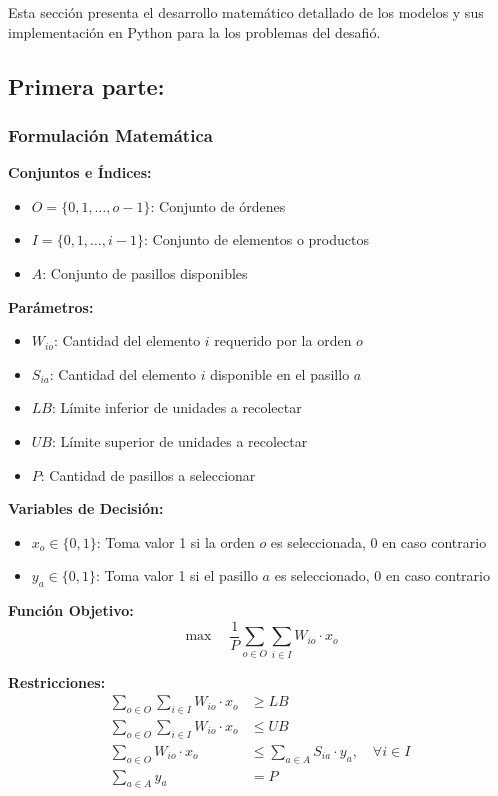 \documentclass[a4paper,12pt]{article}
\begin{document}
Esta sección presenta el desarrollo matemático detallado de los modelos y sus implementación en Python para la los problemas del desafió.

\subsection{Primera parte:}
\label{sec:variante1}

\subsubsection{Formulación Matemática}

\textbf{Conjuntos e Índices:}
\begin{itemize}
    \item $O = \{0, 1, \ldots, o{-}1\}$: Conjunto de órdenes
    \item $I = \{0, 1, \ldots, i{-}1\}$: Conjunto de elementos o productos
    \item $A$: Conjunto de pasillos disponibles
\end{itemize}

\textbf{Parámetros:}
\begin{itemize}
    \item $W_{io}$: Cantidad del elemento $i$ requerido por la orden $o$
    \item $S_{ia}$: Cantidad del elemento $i$ disponible en el pasillo $a$
    \item $LB$: Límite inferior de unidades a recolectar
    \item $UB$: Límite superior de unidades a recolectar
    \item $P$: Cantidad de pasillos a seleccionar
\end{itemize}

\textbf{Variables de Decisión:}
\begin{itemize}
    \item $x_o \in \{0,1\}$: Toma valor 1 si la orden $o$ es seleccionada, 0 en caso contrario
    \item $y_a \in \{0,1\}$: Toma valor 1 si el pasillo $a$ es seleccionado, 0 en caso contrario
\end{itemize}

\textbf{Función Objetivo:}
\begin{equation}
\max \quad \frac{1}{P} \sum_{o \in O} \sum_{i \in I} W_{io} \cdot x_o
\end{equation}

\textbf{Restricciones:}
\begin{align}
\sum_{o \in O} \sum_{i \in I} W_{io} \cdot x_o &\geq LB \label{eq:limite_inferior} \\[6pt]
\sum_{o \in O} \sum_{i \in I} W_{io} \cdot x_o &\leq UB \label{eq:limite_superior} \\[6pt]
\sum_{o \in O} W_{io} \cdot x_o &\leq \sum_{a \in A} S_{ia} \cdot y_a, \quad \forall i \in I \label{eq:disponibilidad} \\[6pt]
\sum_{a \in A} y_a &= P \label{eq:pasillos_fijos}
\end{align}
\end{document}
